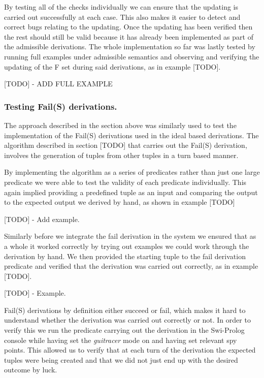 By testing all of the checks individually we can ensure that the updating is carried out successfully at each case. This also makes it easier to detect and correct bugs relating to the updating. Once the updating has been verified then the rest should still be valid because it has already been implemented as part of the admissible derivations. The whole implementation so far was lastly tested by running full examples under admissible semantics and observing and verifying the updating of the F set during said derivations, as in example [TODO].

[TODO] - ADD FULL EXAMPLE

\subsubsection{Testing Fail(S) derivations.}
The approach described in the section above was similarly used to test the implementation of the Fail(S) derivations used in the ideal based derivations. The algorithm described in section [TODO] that carries out the Fail(S) derivation, involves the generation of tuples from other tuples in a turn based manner. 

By implementing the algorithm as a series of predicates rather than just one large predicate we were able to test the validity of each predicate individually. This again implied providing a predefined tuple as an input and comparing the output to the expected output we derived by hand, as shown in example [TODO]

[TODO] - Add example.

Similarly before we integrate the fail derivation in the system we ensured that as a whole it worked correctly by trying out examples we could work through the derivation by hand. We then provided the starting tuple to the fail derivation predicate and verified that the derivation was carried out correctly, as in example [TODO].

[TODO] - Example.

Fail(S) derivations by definition either succeed or fail, which makes it hard to understand whether the derivation was carried out correctly or not. In order to verify this we run the predicate carrying out the derivation in the Swi-Prolog console while having set the \emph{guitracer} mode on and having set relevant spy points. This allowed us to verify that at each turn of the derivation the expected tuples were being created and that we did not just end up with the desired outcome by luck.


